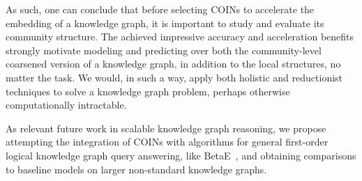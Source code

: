 As such, one can conclude that before selecting COINs to accelerate the embedding of a knowledge graph, it is important to study and evaluate its community structure. The achieved impressive accuracy and acceleration benefits strongly motivate modeling and predicting over both the community-level coarsened version of a knowledge graph, in addition to the local structures, no matter the task. We would, in such a way, apply both holistic and reductionist techniques to solve a knowledge graph problem, perhaps otherwise computationally intractable.

As relevant future work in scalable knowledge graph reasoning, we propose attempting the integration of COINs with algorithms for general first-order logical knowledge graph query answering, like BetaE~\cite{ren_beta_2020}, and obtaining comparisons to baseline models on larger non-standard knowledge graphs.